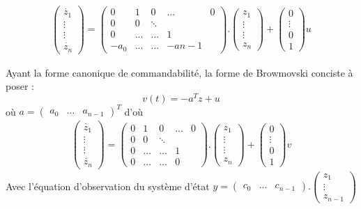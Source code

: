 \documentclass[../main.tex]{subfiles}
\begin{document}
\begin{enumerate}
\begin{align*}
\begin{pmatrix}
\dot{z_1}\\\vdots\\\vdots\\\dot{z_n}\end{pmatrix} = \begin{pmatrix}
0&1&0&...&0\\
0&0&\ddots&&\\
0&...&...&1\\
-a_0&...&...&-a{n-1}
\end{pmatrix}.\begin{pmatrix}
z_1\\\vdots\\\vdots\\z_n
\end{pmatrix} + \begin{pmatrix}
0\\\vdots\\0\\1
\end{pmatrix}u
\end{align*}

Ayant la forme canonique de commandabilité, la forme de Browmovski conciste à poser :\\\[\boxed{v(t) = -a^Tz + u}\]
où $a = \begin{pmatrix}
a_0 &...&a_{n-1}
\end{pmatrix}^T$
d'où
\begin{align*}
\begin{pmatrix}
\dot{z_1}\\\vdots\\\vdots\\\dot{z_n}\end{pmatrix} = \begin{pmatrix}
0&1&0&...&0\\
0&0&\ddots&&\\
0&...&...&1\\
0&...&...&0
\end{pmatrix}.\begin{pmatrix}
z_1\\\vdots\\\vdots\\z_n
\end{pmatrix} + \begin{pmatrix}
0\\\vdots\\0\\1
\end{pmatrix}v
\end{align*}
Avec l'équation d'observation du système d'état $y = \begin{pmatrix}
c_0&...&c_{n-1}
\end{pmatrix}.\begin{pmatrix}
z_1\\\vdots\\z_{n-1}
\end{pmatrix}$


\end{enumerate}
\end{document}
